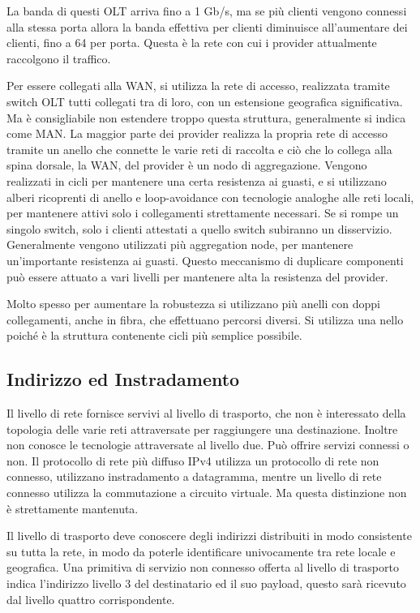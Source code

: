 \documentclass{article}
\numberwithin{equation}{subsection}
\begin{document}
La banda di questi OLT arriva fino a 1 Gb/s, ma se più clienti vengono connessi alla stessa porta allora la banda effettiva per clienti diminuisce all'aumentare dei 
clienti, fino a 64 per porta. Questa è la rete con cui i provider attualmente raccolgono il traffico. 

Per essere collegati alla WAN, si utilizza la rete di accesso, realizzata tramite switch OLT tutti collegati tra di loro, con un estensione geografica significativa. 
Ma è consigliabile non estendere troppo questa struttura, generalmente si indica come MAN. 
La maggior parte dei provider realizza la propria rete di accesso tramite un anello che connette le varie reti di raccolta e ciò che lo collega alla spina dorsale, la WAN, 
del provider è un nodo di aggregazione. 
Vengono realizzati in cicli per mantenere una certa resistenza ai guasti, e si utilizzano alberi ricoprenti di anello e loop-avoidance con tecnologie analoghe alle 
reti locali, per mantenere attivi solo i collegamenti strettamente necessari. 
Se si rompe un singolo switch, solo i clienti attestati a quello switch subiranno un disservizio. Generalmente vengono utilizzati più aggregation node, per mantenere 
un'importante resistenza ai guasti. Questo meccanismo di duplicare componenti può essere attuato a vari livelli per mantenere alta la resistenza del provider. 

Molto spesso per aumentare la robustezza si utilizzano più anelli con doppi collegamenti, anche in fibra, che effettuano percorsi diversi. 
Si utilizza una nello poiché è la struttura contenente cicli più semplice possibile. 

\subsection{Indirizzo ed Instradamento}

Il livello di rete fornisce servivi al livello di trasporto, che non è interessato della topologia delle varie reti attraversate per raggiungere una destinazione. Inoltre 
non conosce le tecnologie attraversate al livello due. Può offrire servizi connessi o non. Il protocollo di rete più diffuso IPv4 utilizza un protocollo di rete 
non connesso, utilizzano instradamento a datagramma, mentre un livello di rete connesso utilizza la commutazione a circuito virtuale. Ma questa distinzione non è 
strettamente mantenuta. 

Il livello di trasporto deve conoscere degli indirizzi distribuiti in modo consistente su tutta la rete, in modo da poterle identificare univocamente tra rete locale 
e geografica. Una primitiva di servizio non connesso offerta al livello di trasporto indica l'indirizzo livello 3 del destinatario ed il suo payload, questo sarà ricevuto 
dal livello quattro corrispondente. 
\end{document}
